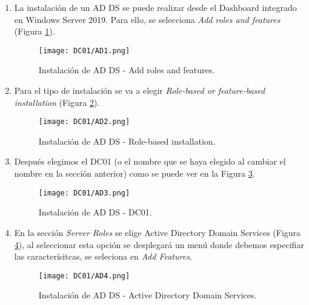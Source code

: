 \begin{enumerate}

\item La instalación de un AD DS se puede realizar desde el Dashboard integrado en Windows Server 2019. Para ello, se selecciona {\it Add roles and features} (Figura \ref{DC01-AD1}).
\begin{figure}[H] %
\begin{center}
\texttt{[image: DC01/AD1.png]}
\end{center}
\caption{Instalación de AD DS - Add roles and features.}
\label{DC01-AD1}
\end{figure}


\item Para el tipo de instalación se va a elegir {\it Role-based or feature-based installation} (Figura \ref{DC01-AD2}).
\begin{figure}[H] %
\begin{center}
\texttt{[image: DC01/AD2.png]}
\end{center}
\caption{Instalación de AD DS - Role-based installation.}
\label{DC01-AD2}
\end{figure}


\item Después elegimos el DC01 (o el nombre que se haya elegido al cambiar el nombre en la sección anterior) como se puede ver en la Figura \ref{DC01-AD3}.
\begin{figure}[H] %
\begin{center}
\texttt{[image: DC01/AD3.png]}
\end{center}
\caption{Instalación de AD DS - DC01.}
\label{DC01-AD3}
\end{figure}


\item En la sección {\it Server Roles} se elige Active Directory Domain Services (Figura \ref{DC01-AD4}), al seleccionar esta opción se desplegará un menú donde debemos especifiar las caracterísitcas, se seleciona en {\it Add Features}.
\begin{figure}[H] %
\begin{center}
\texttt{[image: DC01/AD4.png]}
\end{center}
\caption{Instalación de AD DS - Active Directory Domain Services.}
\label{DC01-AD4}
\end{figure}



\end{enumerate}
